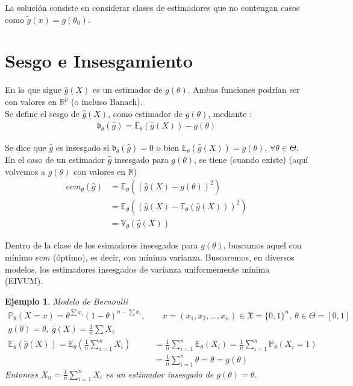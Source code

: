 \documentclass[10pt]{article}
\theoremstyle{plain}
\newtheorem{ej}{Ejemplo}
\theoremstyle{definition}
\begin{document}
La solución consiste en considerar clases de estimadores que no contengan casos como $\tilde{g}(x) = g(\theta_{0})$.

\section{Sesgo e Insesgamiento}
En lo que sigue $\hat{g}(X)$ es un estimador de $g(\theta)$. Ambas funciones podrían ser con valores en $\mathbb{R}^p$ (o incluso Banach).\\
Se define el sesgo de $\hat{g}(X)$, como estimador de $g(\theta)$, mediante :
\begin{align*}
\mathfrak{b}_{\theta}(\hat{g}) = \mathbb{E}_{\theta}(\hat{g}(X)) - g(\theta)
\end{align*}

Se dice que $\hat{g}$ es insesgado si $\mathfrak{b}_{\theta}(\hat{g}) = 0$ o bien $\mathbb{E}_{\theta}(\hat{g}(X)) = g(\theta)$, $\forall \theta \in \Theta$.\\

En el caso de un estimador $\hat{g}$ insesgado para $g(\theta)$, se tiene (cuando existe) (aquí volvemos a $g(\theta)$ con valores en $\mathbb{R}$)
\begin{align*}
ecm_{\theta}(\hat{g}) &= \mathbb{E}_{\theta}((\hat{g}(X)-g(\theta))^2)\\
&= \mathbb{E}_{\theta}((\hat{g}(X)-\mathbb{E}_{\theta}(\hat{g}(X)))^2)\\
&= \mathbb{V}_{\theta}(\hat{g}(X))
\end{align*}

Dentro de la clase de los esimadores insesgados para $g(\theta)$, buscamos aquel con mínimo $ecm$ (óptimo), es decir, con mínima varianza. Buscaremos, en diversos modelos, los estimadores insesgados de varianza uniformemente mínima (EIVUM).

\begin{ej} Modelo de Bernoulli \\
\begin{align*}
\mathbb{P}_{\theta}(X=x) = \theta^{\sum{x_{i}}}(1-\theta)^{n-\sum{x_{i}}},\ &\quad x = (x_{1}, x_{2}, \ldots, x_{n}) \in \mathfrak{X}=\{0,1\}^n,\ \theta \in \Theta = \left[0,1\right]\\
g(\theta) = \theta,\ \hat{g}(X) = \frac{1}{n}\sum{X_{i}}\\
\mathbb{E}_{\theta}(\hat{g}(X)) = \mathbb{E}_{\theta}(\frac{1}{n}\sum_{i=1}^n{X_{i}}) &= \frac{1}{n}\sum_{i=1}^n\mathbb{E}_{\theta}(X_{i})= \frac{1}{n}\sum_{i=1}^n\mathbb{P}_{\theta}(X_{i} = 1)\\
&= \frac{1}{n}\sum_{i=1}^n\theta = \theta = g(\theta)
\end{align*}
Entonces $\bar{X}_{n} = \frac{1}{n}\sum_{i=1}^nX_{i}$ es un estimador insesgado de $g(\theta) = \theta$.
\end{ej}
\end{document}
